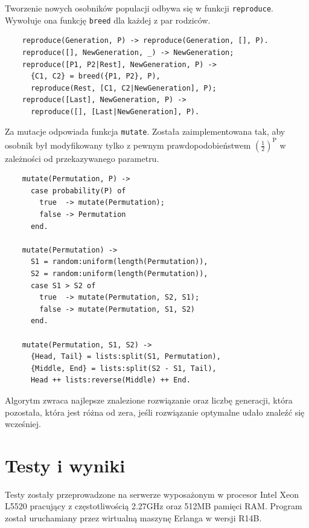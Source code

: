   Tworzenie nowych osobników populacji odbywa się w funkcji \texttt{reproduce}.
  Wywołuje ona funkcję \texttt{breed} dla każdej z par rodziców.
  \singlespacing
  \begin{center}
  \begin{verbatim}
    reproduce(Generation, P) -> reproduce(Generation, [], P).
    reproduce([], NewGeneration, _) -> NewGeneration;
    reproduce([P1, P2|Rest], NewGeneration, P) ->
      {C1, C2} = breed({P1, P2}, P),
      reproduce(Rest, [C1, C2|NewGeneration], P);
    reproduce([Last], NewGeneration, P) ->
      reproduce([], [Last|NewGeneration], P).
  \end{verbatim}
  \end{center}
  \onehalfspacing
  \vspace{1em}

  Za mutacje odpowiada funkcja \texttt{mutate}. Została zaimplementowana tak,
  aby osobnik był modyfikowany tylko z pewnym prawdopodobieństwem
  $(\frac{1}{2})^\textrm{P}$ w zależności od przekazywanego parametru.
  \singlespacing
  \begin{center}
  \begin{verbatim}
    mutate(Permutation, P) ->
      case probability(P) of
        true  -> mutate(Permutation);
        false -> Permutation
      end.

    mutate(Permutation) ->
      S1 = random:uniform(length(Permutation)),
      S2 = random:uniform(length(Permutation)),
      case S1 > S2 of
        true  -> mutate(Permutation, S2, S1);
        false -> mutate(Permutation, S1, S2)
      end.

    mutate(Permutation, S1, S2) ->
      {Head, Tail} = lists:split(S1, Permutation),
      {Middle, End} = lists:split(S2 - S1, Tail),
      Head ++ lists:reverse(Middle) ++ End.
  \end{verbatim}
  \end{center}
  \onehalfspacing
  \vspace{1em}

  Algorytm zwraca najlepsze znalezione rozwiązanie oraz liczbę generacji, która
  pozostała, która jest różna od zera, jeśli rozwiązanie optymalne udało znaleźć
  się wcześniej.

\section{Testy i wyniki} %
  \label{sec:testy}

  Testy zostały przeprowadzone na serwerze wyposażonym w procesor Intel Xeon
  L5520 pracujący z częstotliwością 2.27GHz oraz 512MB pamięci RAM. Program
  został uruchamiany przez wirtualną maszynę Erlanga w wersji R14B.
  \vspace{1em}

